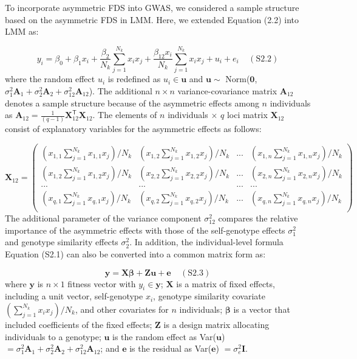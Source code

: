 \documentclass[12pt,]{article}
\begin{document}
To incorporate asymmetric FDS into GWAS, we considered a sample structure based on the asymmetric FDS in LMM. Here, we extended Equation (2.2) into LMM as:

$$y_i = \beta_0 + \beta_1x_i + \frac{\beta_2}{N_k}\sum^{N_{k}}_{j=1}{x_ix_j} + \frac{\beta_{12}x_i}{N_k}\sum^{N_{k}}_{j=1}{x_ix_j} + u_i + e_i~~~~~(\mathrm{S2.2})$$
where the random effect $u_i$ is redefined as $u_i \in \mathbf{u}$ and $\mathbf{u} \sim$ Norm($\mathbf{0}$, $\sigma^2_1\mathbf{A}_1+\sigma^2_2\mathbf{A}_2+\sigma^2_{12}\mathbf{A}_{12}$). The additional $n \times n$ variance-covariance matrix $\mathbf{A}_{12}$ denotes a sample structure because of the asymmetric effects among $n$ individuals as $\mathbf{A}_{12}=\frac{1}{(q-1)}\mathbf{X}_{12}^\mathsf{T} \mathbf{X}_{12}$. The elements of $n$ individuals $\times$ $q$ loci matrix $\mathbf{X}_{12}$ consist of explanatory variables for the asymmetric effects as follows:

$$\mathbf{X}_{12}=\left(\begin{array}{cccc}
    (x_{1,1}\sum^{N_k}_{j=1}x_{1,1} x_j)/N_k &  (x_{1,2}\sum^{N_k}_{j=1}x_{1,2} x_j)/N_k &  ... &  (x_{1,n}\sum^{N_k}_{j=1}x_{1,n} x_j)/N_k \\ 
    (x_{1,2}\sum^{N_k}_{j=1}x_{1,2} x_j)/N_k &  (x_{2,2}\sum^{N_k}_{j=1}x_{2,2} x_j)/N_k &  ... &  (x_{2,n}\sum^{N_k}_{j=1}x_{2,n} x_j)/N_k\\
    ... & ... & ... & ... \\
    (x_{q,1}\sum^{N_k}_{j=1}x_{q,1} x_j)/N_k &  (x_{q,2}\sum^{N_k}_{j=1}x_{q,2} x_j)/N_k &  ... &  (x_{q,n}\sum^{N_k}_{j=1}x_{q,n} x_j)/N_k \\
    \end{array} \right)
$$
The additional parameter of the variance component $\sigma^2_{12}$ compares the relative importance of the asymmetric effects with those of the self-genotype effects $\sigma^2_1$ and genotype similarity effects $\sigma^2_2$.
In addition, the individual-level formula Equation (S2.1) can also be converted into a common matrix form \citep{henderson1959estimation} as:

$$\mathbf{y}=\mathbf{X}\bm{\beta}+\mathbf{Zu}+\mathbf{e}~~~~~(\mathrm{S2.3})$$
where $\mathbf{y}$ is $n \times 1$ fitness vector with $y_i \in \mathbf{y}$; $\mathbf{X}$ is a matrix of fixed effects, including a unit vector, self-genotype $x_i$, genotype similarity covariate $(\sum^{N_k}_{j=1}x_i x_j)/N_k$, and other covariates for $n$ individuals; $\bm{\beta}$ is a vector that included coefficients of the fixed effects; $\mathbf{Z}$ is a design matrix allocating individuals to a genotype; $\mathbf{u}$ is the random effect as Var($\mathbf{u}$) $=\sigma^2_1\mathbf{A}_1+\sigma^2_2\mathbf{A}_2+\sigma^2_{12}\mathbf{A}_{12}$; and $\mathbf{e}$ is the residual as Var($\mathbf{e}$) $=\sigma^2_e\mathbf{I}$. 
\end{document}
